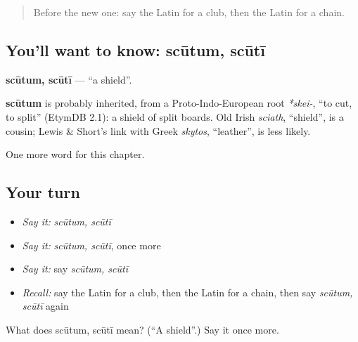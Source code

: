 \label{lesson:LA-C251-scutum}



\begin{quote}
Before the new one: say the Latin for a club, then the Latin for a chain.
\end{quote}

\subsection*{You'll want to know: scūtum, scūtī}
\textbf{scūtum, scūtī} — \textquotedblleft{}a shield\textquotedblright{}.

\begin{cousinweb}
\textbf{scūtum} is probably inherited, from a Proto-Indo-European root \emph{*skei-}, \textquotedblleft{}to cut, to split\textquotedblright{} (EtymDB 2.1): a shield of split boards. Old Irish \emph{sciath}, \textquotedblleft{}shield\textquotedblright{}, is a cousin; Lewis \& Short's link with Greek \emph{skytos}, \textquotedblleft{}leather\textquotedblright{}, is less likely.
\end{cousinweb}

\begin{grammarlens}[title={What you've built}]
One more word for this chapter.
\end{grammarlens}

\subsection*{Your turn}
\begin{itemize}
\raggedright
  \item \emph{Say it:} \emph{scūtum, scūtī}
  \item \emph{Say it:} \emph{scūtum, scūtī}, once more
  \item \emph{Say it:} say \emph{scūtum, scūtī}
  \item \emph{Recall:} say the Latin for a club, then the Latin for a chain, then say \emph{scūtum, scūtī} again
\end{itemize}

\begin{tcolorbox}[breakable,colback=teal!4,colframe=teal!35!black,title={Before you move on}]
What does scūtum, scūtī mean? (\textquotedblleft{}A shield\textquotedblright{}.) Say it once more.
\end{tcolorbox}
